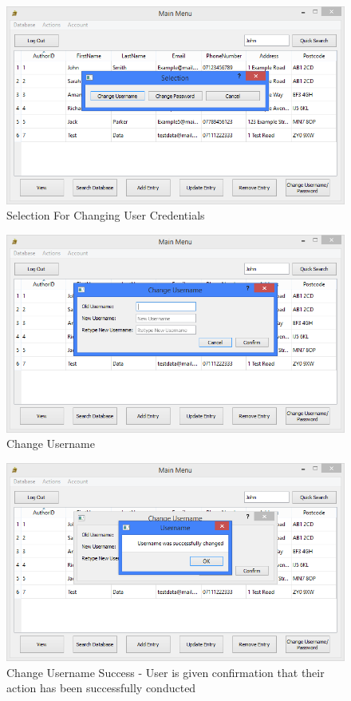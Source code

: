 \begin{figure}[H]
    \caption{Selection For Changing User Credentials} \label{fig:ChangeSelection}
    \includegraphics[width=\textwidth]{./Maintenance/UserInterface/ChangeSelection.png}
\end{figure}

\begin{figure}[H]
    \caption{Change Username} \label{fig:ChangeUsername}
    \includegraphics[width=\textwidth]{./Maintenance/UserInterface/ChangeUsername.png}
\end{figure}

\begin{figure}[H]
    \caption{Change Username Success - User is given confirmation that their action has been successfully conducted} \label{fig:ChangeUsernameSuccess}
    \includegraphics[width=\textwidth]{./Maintenance/UserInterface/ChangeUsernameSuccess.png}
\end{figure}

